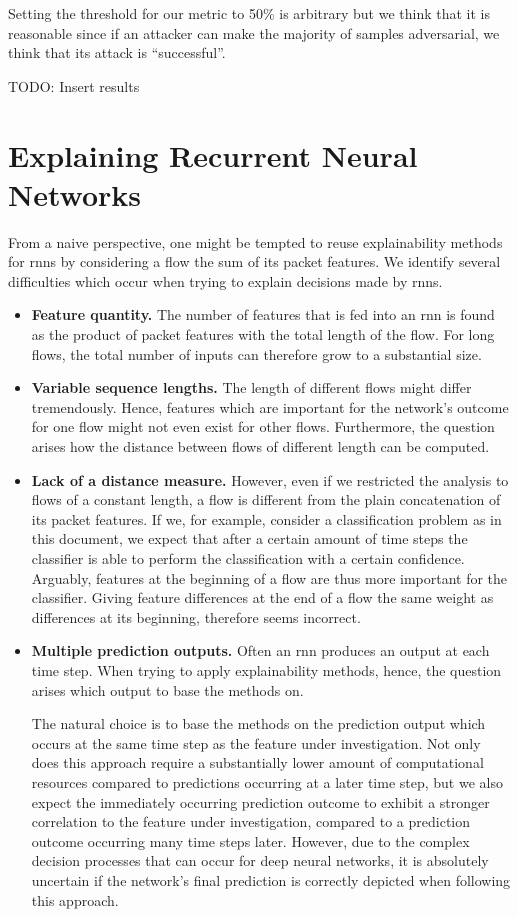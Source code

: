 \documentclass[conference]{IEEEtran}
\newcommand\note[2]{{\color{#1}#2}}
\newcommand\todo[1]{{\note{red}{TODO: #1}}}
\begin{document}
Setting the threshold for our metric to 50\% is arbitrary but we think that it is reasonable since if an attacker can make the majority of samples adversarial, we think that its attack is ``successful''.

\todo{Insert results}

\section{Explaining Recurrent Neural Networks}
From a naive perspective, one might be tempted to reuse explainability methods for \glspl{rnn} by considering a flow the sum of its packet features.
We identify several difficulties which occur when trying to explain decisions made by \glspl{rnn}. 

\begin{itemize}
\item
\textbf{Feature quantity.}
The number of features that is fed into an \gls{rnn} is found as the product of packet features with the total length of the flow. For long flows, the total number of inputs can therefore grow to a substantial size.

\item
\textbf{Variable sequence lengths.}
The length of different flows might differ tremendously. Hence, features which are important for the network's outcome for one flow might not even exist for other flows. Furthermore, the question arises how the distance between flows of different length can be computed.

\item
\textbf{Lack of a distance measure.}
However, even if we restricted the analysis to flows of a constant length, a flow is different from the plain concatenation of its packet features.
If we, for example, consider a classification problem as in this document, we expect that after a certain amount of time steps the classifier is able to perform the classification with a certain confidence. Arguably, features at the beginning of a flow are thus more important for the classifier. Giving feature differences at the end of a flow the same weight as differences at its beginning, therefore seems incorrect.

\item
\textbf{Multiple prediction outputs.}
Often an \gls{rnn} produces an output at each time step. When trying to apply explainability methods, hence, the question arises which output to base the methods on.

The natural choice is to base the methods on the prediction output which occurs at the same time step as the feature under investigation. Not only does this approach require a substantially lower amount of computational resources compared to predictions occurring at a later time step, but we also expect the immediately occurring prediction outcome to exhibit a stronger correlation to the feature under investigation, compared to a prediction outcome occurring many time steps later.
However, due to the complex decision processes that can occur for deep neural networks, it is absolutely  uncertain if the network's final prediction is correctly depicted when following this approach.
\end{itemize}
\end{document}
